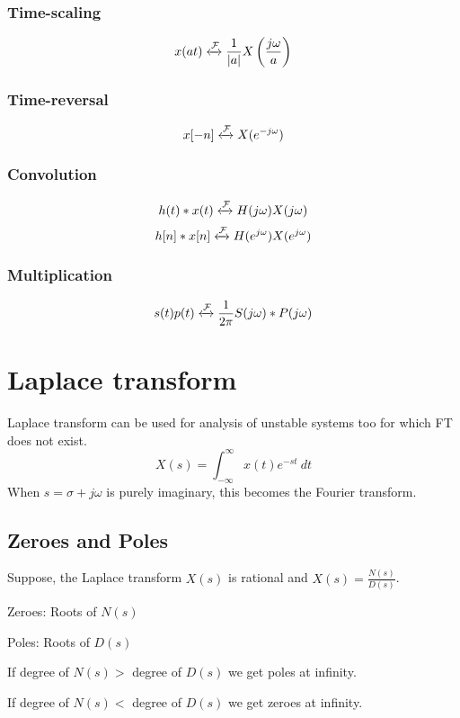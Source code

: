 \documentclass[10pt, a4paper]{extarticle}
\theoremstyle{definition}
\begin{document}
		\subsubsection{Time-scaling}
		\[x(at)\xleftrightarrow{\mathcal{F}}\frac{1}{|a|}X\left(\frac{j\omega}{a}\right)\]
		\subsubsection{Time-reversal}
		\[x[-n]\xleftrightarrow{\mathcal{F}}X(e^{-j\omega})\]
		\subsubsection{Convolution}
		\[h(t)*x(t)\xleftrightarrow{\mathcal{F}}H(j\omega)X(j\omega)\]
		\[h[n]*x[n]\xleftrightarrow{\mathcal{F}}H(e^{j\omega})X(e^{j\omega})\]

		\subsubsection{Multiplication}
		\[s(t)p(t)\xleftrightarrow{\mathcal{F}}\frac{1}{2\pi}S(j\omega)*P(j\omega)\]

		\section{Laplace transform}
		Laplace transform can be used for analysis of unstable systems too for which FT does not exist.
		\[X(s)=\int_{-\infty}^{\infty}x(t)e^{-st}\ dt\]
		When $s=\sigma+j\omega$ is purely imaginary, this becomes the Fourier transform.
		\subsection{Zeroes and Poles}
		Suppose, the Laplace transform $X(s)$ is rational and $X(s)=\frac{N(s)}{D(s)}$.

		Zeroes: Roots of $N(s)$

		Poles: Roots of $D(s)$

		If degree of $N(s)>$ degree of $D(s)$ we get poles at infinity.

		If degree of $N(s)<$ degree of $D(s)$ we get zeroes at infinity.
\end{document}
